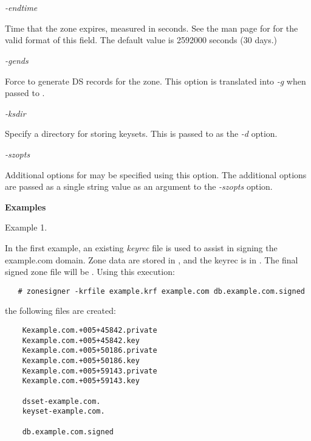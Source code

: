 \begin{description}

\item {\it -endtime}\verb" "

Time that the zone expires, measured in seconds.  See the man page for
 for the valid format of this field.
The default value is 2592000 seconds (30 days.)

\item {\it -gends}\verb" "

Force  to generate DS records for the zone.  This option
is translated into {\it -g} when passed to .

\item {\it -ksdir}\verb" "

Specify a directory for storing keysets.  This is passed to
 as the {\it -d} option.

\item {\it -szopts}\verb" "

Additional options for  may be specified using this
option.  The additional options are passed as a single string value as an
argument to the {\it -szopts} option.

\end{description}

{\bf Examples}

Example 1.

In the first example, an existing {\it keyrec} file is used to assist in
signing the example.com domain.  Zone data are stored in ,
and the keyrec is in .  The final signed zone file will be
.  Using this execution:

\begin{verbatim}
   # zonesigner -krfile example.krf example.com db.example.com.signed
\end{verbatim}

the following files are created:

\begin{verbatim}
    Kexample.com.+005+45842.private
    Kexample.com.+005+45842.key
    Kexample.com.+005+50186.private
    Kexample.com.+005+50186.key
    Kexample.com.+005+59143.private
    Kexample.com.+005+59143.key

    dsset-example.com.
    keyset-example.com.

    db.example.com.signed
\end{verbatim}

